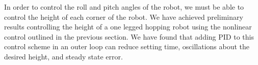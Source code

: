 In order to control the roll and pitch angles of the robot, we must be able to control the height of each corner of the robot. We have achieved preliminary results controlling the height of a one legged hopping robot using the nonlinear control outlined in the previous section. We have found that adding PID to this control scheme in an outer loop can reduce setting time, oscillations about the desired height, and steady state error.
